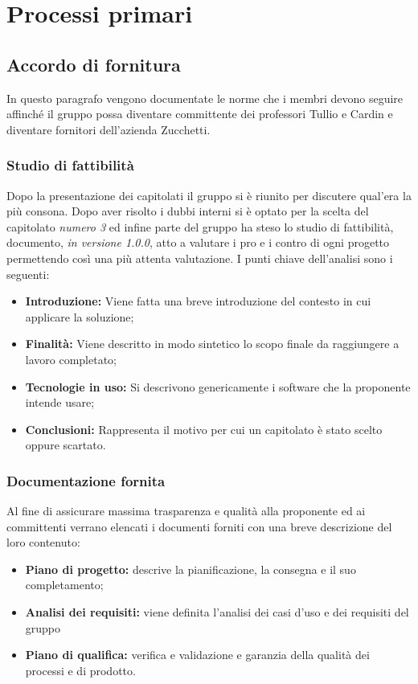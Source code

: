 \section{Processi primari}
    \subsection{Accordo di fornitura}
    	In questo paragrafo vengono documentate le norme che i membri devono seguire affinché il gruppo possa diventare committente dei professori Tullio e Cardin e diventare fornitori dell'azienda Zucchetti.
    \subsubsection{Studio di fattibilità}
        Dopo la presentazione dei capitolati il gruppo si è riunito per discutere qual'era la più consona. Dopo aver risolto i dubbi interni si è optato per la scelta del capitolato \textit{numero 3} ed infine parte del gruppo ha steso lo studio di fattibilità, documento, \textit{in versione 1.0.0},  atto a valutare i pro e i contro di ogni progetto permettendo così una più attenta valutazione. \newline
        I punti chiave dell'analisi sono i seguenti:
    	\begin{itemize}
		   \item \textbf{Introduzione:} Viene fatta una breve introduzione del contesto in cui applicare la soluzione;
		   \item \textbf{Finalità: } Viene descritto in modo sintetico lo scopo finale da raggiungere a lavoro completato;
		   \item \textbf{Tecnologie in uso:} Si descrivono genericamente i software che la proponente intende usare;
		   \item \textbf{Conclusioni:} Rappresenta il motivo per cui un capitolato è stato scelto oppure scartato.
	    \end{itemize}
    \subsubsection{Documentazione fornita}
	    Al fine di assicurare massima trasparenza e qualità alla proponente ed ai committenti verrano elencati i documenti forniti con una breve descrizione del loro contenuto:
    	\begin{itemize}
	        \item \textbf{Piano di progetto:} descrive la pianificazione, la consegna e il suo completamento;
	        \item \textbf{Analisi dei requisiti:} viene definita l'analisi dei casi d'uso e dei requisiti del gruppo
	        \item \textbf{Piano di qualifica:} verifica e validazione e garanzia della qualità dei processi e di prodotto.
	    \end{itemize}
    \newpage    
